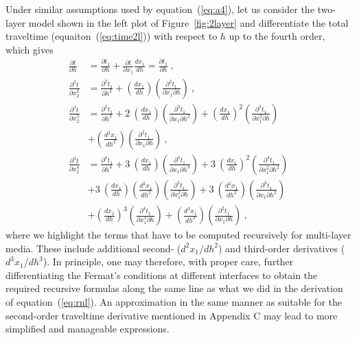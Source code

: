 Under similar assumptions used by equation~(\ref{eq:a4}), let us consider the two-layer model shown in the left plot of Figure~\ref{fig:2layer} and differentiate the total traveltime (equaiton~(\ref{eq:time2l})) with respect to $h$ up to the fourth order, which gives
\begin{align}
\frac{\partial t}{\partial h} & = \frac{\partial t_1}{\partial h} +  \frac{\partial t}{\partial x_1}  \frac{d x_1}{d h}   = \frac{\partial t_1}{\partial h}~, \\
\frac{\partial^2 t}{\partial x^2_2} & = \frac{\partial^2 t_1}{\partial h^2} + \boxed{\left( \frac{d x_1}{d h}\right)} \left(\frac{\partial^2 t_1}{\partial x_1 \partial h} \right) ~, \\
\nonumber
\frac{\partial^3 t}{\partial x^3_2} & = \frac{\partial^3 t_1}{\partial h^3} +  2~\boxed{\left( \frac{d x_1}{d h}\right)} \left(\frac{\partial^3 t_1}{\partial x_1 \partial h^2} \right) +  \boxed{\left( \frac{d x_1}{d h}\right)^2} \left(\frac{ \partial^3 t_1}{\partial x_1^2 \partial h} \right)  \\
& +  \boxed{\left( \frac{d ^2x_1}{d h^2}\right)} \left(\frac{ \partial^2 t_1}{\partial x_1 \partial h} \right) ~, \\
\nonumber
\frac{\partial^4 t}{\partial x^4_2} & = \frac{\partial^4 t_1}{\partial h^4} + 3 ~\boxed{\left( \frac{d x_1}{d h}\right)} \left(\frac{\partial^4 t_1}{\partial x_1 \partial h^3} \right) +  3~\boxed{\left( \frac{d x_1}{d h}\right)^2} \left(\frac{ \partial^4 t_1}{\partial x_1^2 \partial h^2} \right) \\
\nonumber
& +  3~\boxed{\left( \frac{d x_1}{d h}\right)\left( \frac{d^2 x_1}{d h^2}\right)} \left(\frac{ \partial^3 t_1}{\partial x_1^2 \partial h} \right) +  3~\boxed{\left( \frac{d^2 x_1}{d h^2}\right)} \left(\frac{ \partial^3 t_1}{\partial x_1 \partial h^2} \right) \\
& + \boxed{\left( \frac{d x_1}{d h}\right)^3} \left(\frac{\partial^4 t_1}{\partial x_1^3 \partial h} \right) +  \boxed{\left( \frac{d^3 x_1}{d h^3}\right)} \left(\frac{\partial^2 t_1}{\partial x_1 \partial h} \right)~,
\end{align}
where we highlight the terms that have to be computed recursively for multi-layer media. These include additional second- ($d^2 x_1 / d h^2$) and third-order derivatives ($d^3 x_1 / d h^3$). In principle, one may therefore, with proper care, further differentiating the Fermat's conditions at different interfaces to obtain the required recursive formulas along the same line as what we did in the derivation of equation~(\ref{eq:rnl}). An approximation in the same manner as \cite{blias2006} suitable for the second-order traveltime derivative mentioned in Appendix C may lead to more simplified and manageable expressions. 

